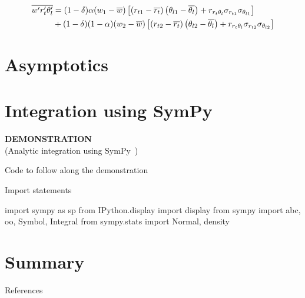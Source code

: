 \documentclass[10pt]{beamer}
\numberwithin{equation}{section}
\begin{document}
    \begin{frame}
        \begin{align}
            \label{eq:w_prime_r_t_prime_t_l_prime_bar}
            \overline{w' r_t' \theta_l'}
            &= (1 - \delta) \alpha (w_1 - \overline{w}) \left[
                \left(r_{t1} - \overline{r_t}\right)
                \left(\theta_{l1} - \overline{\theta_l}\right) +
                r_{r_t \theta_l} \sigma_{r_{t1}} \sigma_{\theta_{l1}}
                \right] \nonumber\\
            &+ (1 - \delta) (1 - \alpha) (w_2 - \overline{w}) \left[
                \left(r_{t2} - \overline{r_t}\right)
                \left(\theta_{l2} - \overline{\theta_l}\right) +
                r_{r_t \theta_l} \sigma_{r_{t2}} \sigma_{\theta_{l2}}
                \right]
        \end{align}
    \end{frame}


    \section{Asymptotics}\label{sec:asymptotics}

    \begin{frame}{}

    \end{frame}


    \section{Integration using SymPy}\label{sec:integration-using-sympy}

    \begin{frame}
        \begin{center}
            \textbf{DEMONSTRATION} \\
            (Analytic integration using SymPy~\autocite{10.7717/peerj-cs.103})
        \end{center}
    \end{frame}

    \begin{frame}{Code to follow along the demonstration}
        \begin{listing}[!ht]
            \caption{Import statements}
            \label{lst:import}
            \begin{pythoncode}
                import sympy as sp
                from IPython.display import display
                from sympy import abc, oo, Symbol, Integral
                from sympy.stats import Normal, density
            \end{pythoncode}
        \end{listing}
    \end{frame}


    \section{Summary}\label{sec:summary}

    \begin{frame}{}

    \end{frame}

    \begin{frame}[allowframebreaks]{References}
        \printbibliography
    \end{frame}
\end{document}
